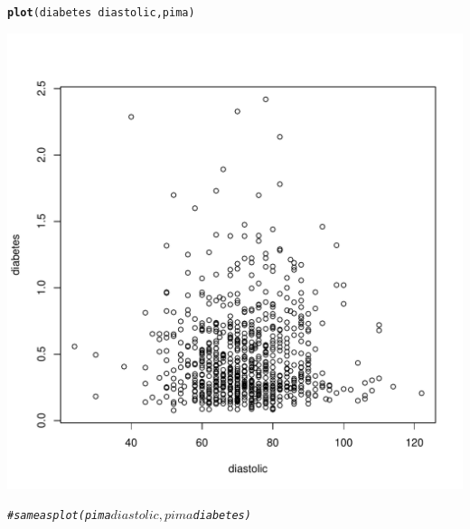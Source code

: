 \documentclass[11pt, a4paper]{article}\usepackage[]{graphicx}\usepackage[]{xcolor}
\makeatletter
\def\maxwidth{ %
  \ifdim\Gin@nat@width>\linewidth
    \linewidth
  \else
    \Gin@nat@width
  \fi
}
\newcommand{\hlcom}[1]{\textcolor[rgb]{0.678,0.584,0.686}{\textit{#1}}}%
\newcommand{\hlopt}[1]{\textcolor[rgb]{0,0,0}{#1}}%
\newcommand{\hlstd}[1]{\textcolor[rgb]{0.345,0.345,0.345}{#1}}%
\newcommand{\hlkwd}[1]{\textcolor[rgb]{0.737,0.353,0.396}{\textbf{#1}}}%
\newenvironment{kframe}{%
 \def\at@end@of@kframe{}%
 \ifinner\ifhmode%
  \def\at@end@of@kframe{\end{minipage}}%
  \begin{minipage}{\columnwidth}%
 \fi\fi%
 \def\FrameCommand##1{\hskip\@totalleftmargin \hskip-\fboxsep
 \colorbox{shadecolor}{##1}\hskip-\fboxsep
     \hskip-\linewidth \hskip-\@totalleftmargin \hskip\columnwidth}%
 \MakeFramed {\advance\hsize-\width
   \@totalleftmargin\z@ \linewidth\hsize
   \@setminipage}}%
 {\par\unskip\endMakeFramed%
 \at@end@of@kframe}
\newenvironment{knitrout}{}{} %
\makeatother
\begin{document}
\begin{knitrout}
\color{fgcolor}\begin{kframe}
\begin{alltt}
\hlkwd{plot}\hlstd{(diabetes} \hlopt{~} \hlstd{diastolic, pima)}
\end{alltt}
\end{kframe}
\includegraphics[width=\maxwidth]{figure/unnamed-chunk-13-1} 
\begin{kframe}\begin{alltt}
\hlcom{# same as plot(pima$diastolic, pima$diabetes)}
\end{alltt}
\end{kframe}
\end{knitrout}
\end{document}
